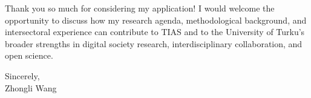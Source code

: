 \documentclass[11pt]{article}
\begin{document}
Thank you so much for considering my application! 
I would welcome the opportunity to discuss how my research agenda, methodological background, and intersectoral experience can contribute to TIAS and to the University of Turku’s broader strengths in digital society research, interdisciplinary collaboration, and open science.

\vspace{6mm}

\noindent Sincerely,\\[15mm]
\noindent Zhongli Wang
\end{document}
